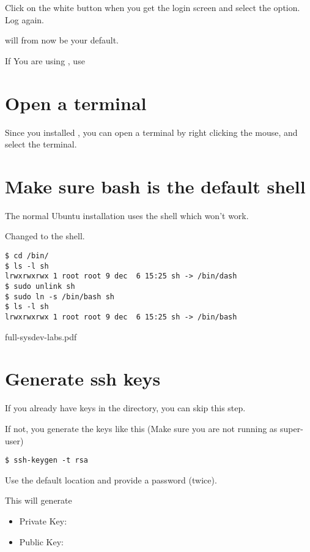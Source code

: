 Click on the white  button when you get the login screen
and select the  option. Log again.

 will from now be your default.

If You are using , use 

\section{Open a terminal}

Since you installed , you can open a terminal
by right clicking the mouse, and select the terminal.


\section{Make sure bash is the default shell}

The normal Ubuntu installation uses the  shell which won't work.

Changed to the  shell.

\begin{verbatim}
$ cd /bin/
$ ls -l sh
lrwxrwxrwx 1 root root 9 dec  6 15:25 sh -> /bin/dash
$ sudo unlink sh
$ sudo ln -s /bin/bash sh
$ ls -l sh
lrwxrwxrwx 1 root root 9 dec  6 15:25 sh -> /bin/bash
\end{verbatim}

\clearpage full-sysdev-labs.pdf 
\section{Generate ssh keys}

If you already have  keys in the  directory, 
you can skip this step.

If not, you generate the keys like this (Make sure you are not running as super-user)

\begin{verbatim}
$ ssh-keygen -t rsa
\end{verbatim}

Use the default location and provide a password (twice).

This will generate 

\begin{itemize}

\item Private Key: 

\item Public Key: 

\end{itemize}

